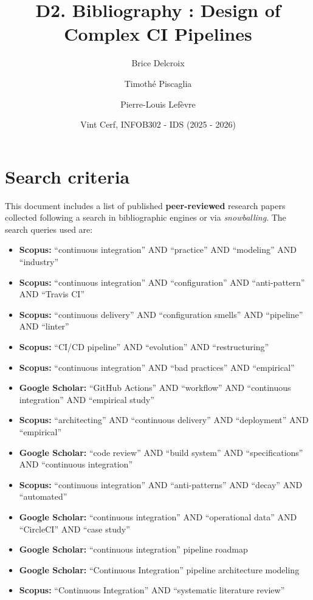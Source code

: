 \documentclass[a4paper,11pt,oneside]{article}
\title{D2. Bibliography : Design of Complex CI Pipelines}
\author{
    Brice Delcroix
    \and Timoth\'{e} Piscaglia
    \and Pierre-Louis Lef\`{e}vre}
\date{
    Vint Cerf, INFOB302 - IDS (2025 - 2026)
}
\begin{document}
\maketitle

\section{Search criteria}

This document includes a list of published \textbf{peer-reviewed} research papers collected following a search in bibliographic engines or via \textit{snowballing}. The search queries used are:
%
\begin{itemize}
    \item \textbf{Scopus:} ``continuous integration'' AND ``practice'' AND ``modeling'' AND ``industry''
    \item \textbf{Scopus:} ``continuous integration'' AND ``configuration'' AND ``anti-pattern'' AND ``Travis CI''
    \item \textbf{Scopus:} ``continuous delivery'' AND ``configuration smells'' AND ``pipeline'' AND ``linter''
    \item \textbf{Scopus:} ``CI/CD pipeline'' AND ``evolution'' AND ``restructuring''
    \item \textbf{Scopus:} ``continuous integration'' AND ``bad practices'' AND ``empirical''
    \item \textbf{Google Scholar:} ``GitHub Actions'' AND ``workflow'' AND ``continuous integration'' AND ``empirical study''
    \item \textbf{Scopus:} ``architecting'' AND ``continuous delivery'' AND ``deployment'' AND ``empirical''
    \item \textbf{Google Scholar:} ``code review'' AND ``build system'' AND ``specifications'' AND ``continuous integration''
    \item \textbf{Scopus:} ``continuous integration'' AND ``anti-patterns'' AND ``decay'' AND ``automated''
    \item \textbf{Google Scholar:} ``continuous integration'' AND ``operational data'' AND ``CircleCI'' AND ``case study''
    \item \textbf{Google Scholar:} ``continuous integration'' pipeline roadmap
    \item \textbf{Google Scholar:} ``Continuous Integration'' pipeline architecture modeling
    \item \textbf{Scopus:} ``Continuous Integration'' AND ``systematic literature review''

\end{itemize}
\end{document}
